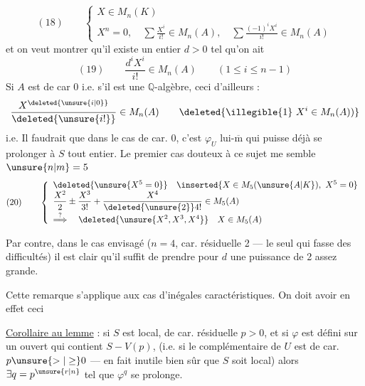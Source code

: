 \[
(18)\qquad
\left\{\begin{array}{l}
X\in M_n(K)\\
X^n=0,\quad\displaystyle\sum\frac{X^i}{i!}\in M_n(A),\quad
\displaystyle\sum\frac{(-1)^iX^i}{i!}\in M_n(A)
\end{array}\right.
\]
et on veut montrer qu'il existe un entier $d>0$ tel qu'on ait
\[
(19)\qquad\frac{d^iX^i}{i!}\in M_n(A)\qquad(1\leq i\leq n-1)
\]
Si $A$ est de car 0 i.e. s'il est une $\mathbb Q$-algèbre, ceci   d'ailleurs :
\[
\frac{X^{\deleted{\unsure{i|0}}}}{\deleted{\unsure{i!}}}\in M_n(A)
\qquad\deleted{\text{\illegible{1}}\ X^i\in M_n(A))}
\]
i.e. Il faudrait que dans le cas de car. 0, c'est $\varphi_U$ lui-$\overline{\mathrm m}$ qui puisse déjà se prolonger à $S$ tout entier. Le premier cas douteux à ce sujet me semble $\unsure{n|m}=5$
\[
(20)\qquad\left\{\begin{array}{l}
\deleted{\unsure{X^5=0}}\quad\inserted{X\in M_5(\unsure{A|K}),\ X^5=0}\\
\displaystyle\frac{X^2}{2}\pm\frac{X^3}{3!}+\frac{X^4}{\deleted{\unsure{2}}4!}\in M_5(A)\\[3pt]
\overset{?}{\Longrightarrow}\quad\deleted{\unsure{X^2,X^3,X^4}}\quad X\in M_5(A)
\end{array}\right.
\]

Par contre, dans le cas envisagé  ($n=4$, car. résiduelle 2 --- le seul qui fasse des difficultés) il est clair qu'il suffit de prendre pour $d$ une puissance de 2 assez grande.

Cette remarque s'applique aux cas d'inégales caractéristiques. On doit avoir en effet ceci

\uline{Corollaire au lemme}  : si $S$ est local, de car. résiduelle $p>0$, et si $\varphi$ est défini sur un ouvert qui contient $S-V(p)$, (i.e. si le complémentaire de $U$ est de car. $p\unsure{>|\geq}0$ --- en fait inutile bien sûr que $S$ soit local) alors $\exists q=p^{\unsure{r|n}}$ tel que $\varphi^q$ se prolonge.

